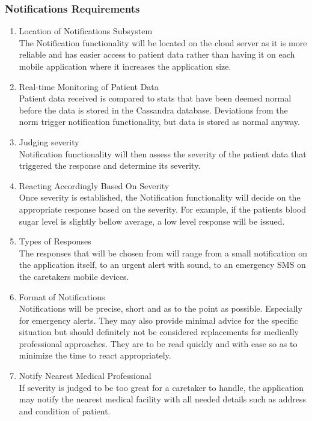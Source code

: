 \subsubsection{Notifications Requirements}
        	\begin{enumerate}
            	\item{Location of Notifications Subsystem\\ The Notification functionality will be located on the cloud server as it is more reliable and has easier access to patient data rather than having it on each mobile application where it increases the application size.}
            	\item{Real-time Monitoring of Patient Data\\Patient data received is compared to stats that have been deemed normal before the data is stored in the Cassandra database. Deviations from the norm trigger notification functionality, but data is stored as normal anyway.}
                \item{Judging severity\\Notification functionality will then assess the severity of the patient data that triggered the response and determine its severity.}
                \item{Reacting Accordingly Based On Severity\\ Once severity is established, the Notification functionality will decide on the appropriate response based on the severity. For example, if the patients blood sugar level is slightly bellow average, a low level response will be issued.}
                \item{Types of Responses\\The responses that will be chosen from will range from a small notification on the application itself, to an urgent alert with sound, to an emergency SMS on the caretakers mobile devices.}
                \item{Format of Notifications\\Notifications will be precise, short and as to the point as possible. Especially for emergency alerts. They may also provide minimal advice for the specific situation but should definitely not be considered replacements for medically professional approaches. They are to be read quickly and with ease so as to minimize the time to react appropriately.}
                \item{Notify Nearest Medical Professional\\ If severity is judged to be too great for a caretaker to handle, the application may notify the nearest medical facility with all needed details such as address and condition of patient.}
            \end{enumerate}
